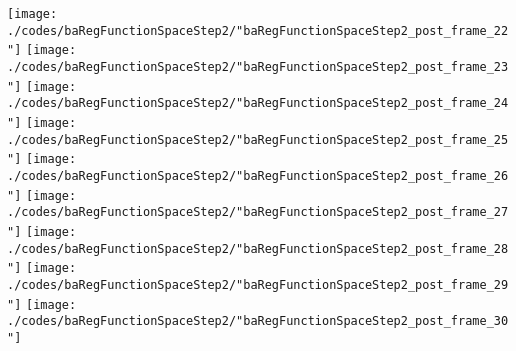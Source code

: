 \begin{frame}{\insertsection}
\begin{center}
{\begin{animateinline}{20}
				 \texttt{[image: ./codes/baRegFunctionSpaceStep2/"baRegFunctionSpaceStep2\_post\_frame\_22"]}\newframe
				 \texttt{[image: ./codes/baRegFunctionSpaceStep2/"baRegFunctionSpaceStep2\_post\_frame\_23"]}\newframe
				 \texttt{[image: ./codes/baRegFunctionSpaceStep2/"baRegFunctionSpaceStep2\_post\_frame\_24"]}\newframe
				 \texttt{[image: ./codes/baRegFunctionSpaceStep2/"baRegFunctionSpaceStep2\_post\_frame\_25"]}\newframe
				 \texttt{[image: ./codes/baRegFunctionSpaceStep2/"baRegFunctionSpaceStep2\_post\_frame\_26"]}\newframe
				 \texttt{[image: ./codes/baRegFunctionSpaceStep2/"baRegFunctionSpaceStep2\_post\_frame\_27"]}\newframe
				 \texttt{[image: ./codes/baRegFunctionSpaceStep2/"baRegFunctionSpaceStep2\_post\_frame\_28"]}\newframe
				 \texttt{[image: ./codes/baRegFunctionSpaceStep2/"baRegFunctionSpaceStep2\_post\_frame\_29"]}\newframe
				 \texttt{[image: ./codes/baRegFunctionSpaceStep2/"baRegFunctionSpaceStep2\_post\_frame\_30"]}
			 \end{animateinline}
			}
	\end{center}
    
\end{frame}








